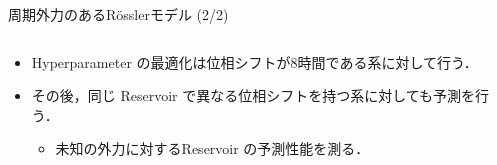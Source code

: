 \begin{frame}{周期外力のあるRösslerモデル (2/2)}
    \begin{columns}[T] %
        \begin{column}{.5\textwidth}
            \begin{itemize}
                \item Hyperparameter の最適化は位相シフトが$8$時間である系に対して行う．
                \item その後，同じ Reservoir で異なる位相シフトを持つ系に対しても予測を行う．\begin{itemize}
                    \item 未知の外力に対するReservoir の予測性能を測る．
                \end{itemize}
            \end{itemize}
            

\end{column}
\end{columns}
\end{frame}
